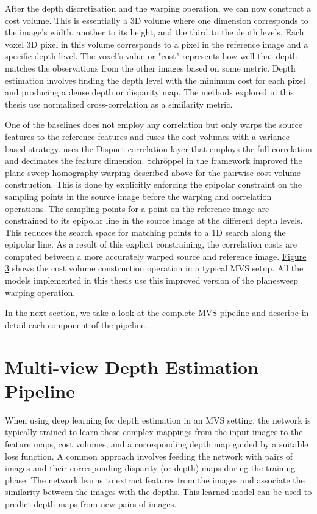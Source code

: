 After the depth discretization and the warping operation, we can now construct a cost volume. This is essentially a 3D volume where one dimension corresponds to the image's width, another to its height, and the third to the depth levels.
Each voxel 3D pixel in this volume corresponds to a pixel in the reference image and a specific depth level. The voxel's value or "cost" represents how well that depth matches the observations from the other images based on some metric. Depth estimation involves finding the depth level with the minimum cost for each pixel and producing a dense depth or disparity map. The methods explored in this thesis use normalized cross-correlation as a similarity metric. \par
One of the baselines {\mvsn} does not employ any correlation but only warps the source features to the reference features and fuses the cost volumes with a variance-based strategy. {\rmvd} uses the Dispnet correlation layer \cite{Mayer2016} that employs the full correlation and decimates the feature dimension. Schröppel \etal in the {\rmvd} framework \cite{schroeppel2022benchmark} improved the plane sweep homography warping described above for the pairwise cost volume construction. This is done by explicitly enforcing the epipolar constraint on the sampling points in the source image before the warping and correlation operations. The sampling points for a point on the reference image are constrained to its epipolar line in the source image at the different depth levels. This reduces the search space for matching points to a 1D search along the epipolar line. As a result of this explicit constraining, the correlation costs are computed between a more accurately warped source and reference image. \hyperref[fig:cvc]{Figure 3} shows the cost volume construction operation in a typical MVS setup. All the models implemented in this thesis use this improved version of the planesweep warping operation. \par
In the next section, we take a look at the complete MVS pipeline and describe in detail each component of the pipeline. 


\section{Multi-view Depth Estimation Pipeline}\label{sec:mvspipeline}
When using deep learning for depth estimation in an MVS setting, the network is typically trained to learn these complex mappings from the input images to the feature maps, cost volumes, and a corresponding depth map guided by a suitable loss function. A common approach involves feeding the network with pairs of images and their corresponding disparity (or depth) maps during the training phase. The network learns to extract features from the images and associate the similarity between the images with the depths. This learned model can be used to predict depth maps from new pairs of images.

